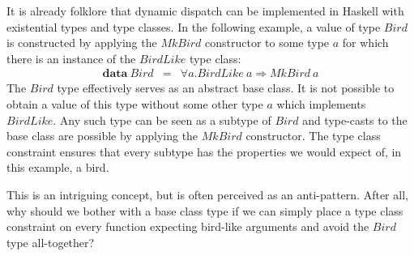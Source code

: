 It is already folklore that dynamic dispatch can be implemented in Haskell with existential types and type classes. In the following example, a value of type $\mathit{Bird}$ is constructed by applying the $\mathit{MkBird}$ constructor to some type $a$ for which there is an instance of the $\mathit{BirdLike}$ type class:
\begin{displaymath}
\begin{array}{lcl}
\mathbf{data}~\mathit{Bird} & = & \forall a. \mathit{BirdLike}~a \Rightarrow \mathit{MkBird}~a
\end{array}
\end{displaymath}
The $\mathit{Bird}$ type effectively serves as an abstract base class. It is not possible to obtain a value of this type without some other type $a$ which implements $\mathit{BirdLike}$. Any such type can be seen as a subtype of $\mathit{Bird}$ and type-casts to the base class are possible by applying the $\mathit{MkBird}$ constructor. The type class constraint ensures that every subtype has the properties we would expect of, in this example, a bird.

This is an intriguing concept, but is often perceived as an anti-pattern. After all, why should we bother with a base class type if we can simply place a type class constraint on every function expecting bird-like arguments and avoid the $\mathit{Bird}$ type all-together?

